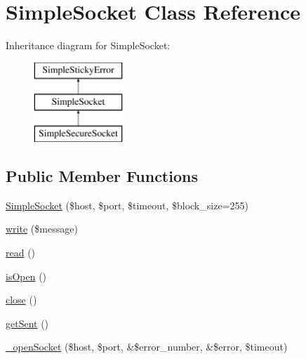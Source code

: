 \hypertarget{class_simple_socket}{
\section{SimpleSocket Class Reference}
\label{class_simple_socket}
}
Inheritance diagram for SimpleSocket:\begin{figure}[H]
\begin{center}
\leavevmode
\includegraphics[height=3.000000cm]{class_simple_socket}
\end{center}
\end{figure}
\subsection*{Public Member Functions}
\begin{DoxyCompactItemize}
\item 
\hyperlink{class_simple_socket_a98655f28b53a14f44635556f57776c6f}{SimpleSocket} (\$host, \$port, \$timeout, \$block\_\-size=255)
\item 
\hyperlink{class_simple_socket_a0c8a3adc1d670b4af4caf7f3f5a054b9}{write} (\$message)
\item 
\hyperlink{class_simple_socket_a893956f7b624e6093f5e0ca51d024e3a}{read} ()
\item 
\hyperlink{class_simple_socket_a62784f70653974c9a2dc1f7f74af04a4}{isOpen} ()
\item 
\hyperlink{class_simple_socket_ad908752f647641818fa09c8277bd5b1c}{close} ()
\item 
\hyperlink{class_simple_socket_a81d45c8f467f9b1edb3eec81dfea3d18}{getSent} ()
\item 
\hyperlink{class_simple_socket_a40c391808591c437200a14ebb2619f83}{\_\-openSocket} (\$host, \$port, \&\$error\_\-number, \&\$error, \$timeout)
\end{DoxyCompactItemize}
